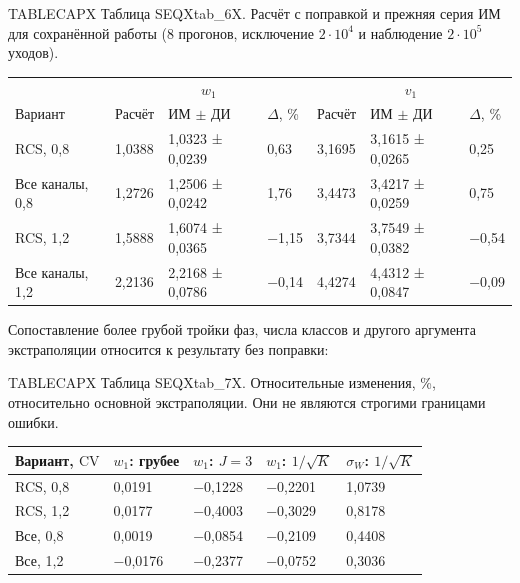\noindent TABLECAPX Таблица SEQXtab_6X. Расчёт с поправкой и прежняя серия ИМ для сохранённой работы (8 прогонов, исключение \(2\cdot10^4\) и наблюдение \(2\cdot10^5\) уходов).\par

\setlength{\tabcolsep}{2pt}
\begin{tabular}{p{4.16cm}p{1.61cm}p{2.83cm}p{1.28cm}p{1.61cm}p{2.83cm}p{1.28cm}}
\toprule
 & \multicolumn{3}{c}{$w_1$} & \multicolumn{3}{c}{$v_1$} \\
Вариант & Расчёт & ИМ $\pm$ ДИ & $\Delta$, \% & Расчёт & ИМ $\pm$ ДИ & $\Delta$, \% \\
\midrule
RCS, 0,8 & 1,0388 & 1,0323 ± 0,0239 & 0,63 & 3,1695 & 3,1615 ± 0,0265 & 0,25 \\
Все каналы, 0,8 & 1,2726 & 1,2506 ± 0,0242 & 1,76 & 3,4473 & 3,4217 ± 0,0259 & 0,75 \\
RCS, 1,2 & 1,5888 & 1,6074 ± 0,0365 & −1,15 & 3,7344 & 3,7549 ± 0,0382 & −0,54 \\
Все каналы, 1,2 & 2,2136 & 2,2168 ± 0,0786 & −0,14 & 4,4274 & 4,4312 ± 0,0847 & −0,09 \\
\bottomrule
\end{tabular}




Сопоставление более грубой тройки фаз, числа классов и другого аргумента экстраполяции относится к результату без поправки:

\noindent TABLECAPX Таблица SEQXtab_7X. Относительные изменения, \%, относительно основной экстраполяции. Они не являются строгими границами ошибки.\par

\setlength{\tabcolsep}{2pt}
\begin{tabular}{p{4.44cm}p{2.79cm}p{2.79cm}p{2.79cm}p{2.79cm}}
\toprule
Вариант, $\mathrm{CV}$ & $w_1$: грубее & $w_1$: $J=3$ & $w_1$: $1/\sqrt K$ & $\sigma_W$: $1/\sqrt K$ \\
\midrule
RCS, 0,8 & 0,0191 & −0,1228 & −0,2201 & 1,0739 \\
RCS, 1,2 & 0,0177 & −0,4003 & −0,3029 & 0,8178 \\
Все, 0,8 & 0,0019 & −0,0854 & −0,2109 & 0,4408 \\
Все, 1,2 & −0,0176 & −0,2377 & −0,0752 & 0,3036 \\
\bottomrule
\end{tabular}





